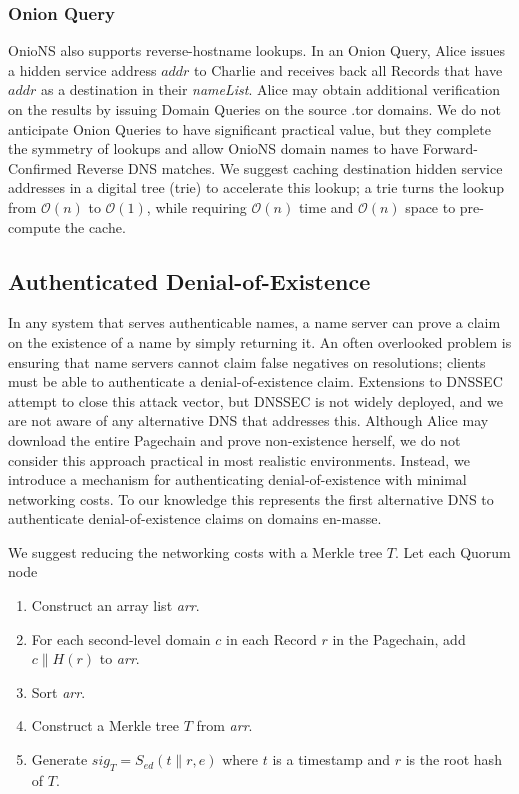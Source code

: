 \documentclass{sig-alternate}
\newcommand*\concat{\mathbin{\|}}
\begin{document}
\subsubsection{Onion Query}

OnioNS also supports reverse-hostname lookups. In an Onion Query, Alice issues a hidden service address $ \mathit{addr} $ to Charlie and receives back all Records that have $ \mathit{addr} $ as a destination in their \emph{nameList}. Alice may obtain additional verification on the results by issuing Domain Queries on the source .tor domains. We do not anticipate Onion Queries to have significant practical value, but they complete the symmetry of lookups and allow OnioNS domain names to have Forward-Confirmed Reverse DNS matches. We suggest caching destination hidden service addresses in a digital tree (trie) to accelerate this lookup; a trie turns the lookup from $ \mathcal{O}(n) $ to $ \mathcal{O}(1) $, while requiring $ \mathcal{O}(n) $ time and $ \mathcal{O}(n) $ space to pre-compute the cache.

\newpage

\subsection{Authenticated Denial-of-Existence}
\label{sec:authDenial}

In any system that serves authenticable names, a name server can prove a claim on the existence of a name by simply returning it. An often overlooked problem is ensuring that name servers cannot claim false negatives on resolutions; clients must be able to authenticate a denial-of-existence claim. Extensions to DNSSEC attempt to close this attack vector, but DNSSEC is not widely deployed, and we are not aware of any alternative DNS that addresses this. Although Alice may download the entire Pagechain and prove non-existence herself, we do not consider this approach practical in most realistic environments. Instead, we introduce a mechanism for authenticating denial-of-existence with minimal networking costs. To our knowledge this represents the first alternative DNS to authenticate denial-of-existence claims on domains en-masse.

We suggest reducing the networking costs with a Merkle tree\cite{merkle1988digital} $ T $. Let each Quorum node

\begin{enumerate}
	\item Construct an array list \emph{arr}.
	\item For each second-level domain $ c $ in each Record $ r $ in the Pagechain, add $ c \concat H(r) $ to \emph{arr}.
	\item Sort \emph{arr}.
	\item Construct a Merkle tree $ T $ from \emph{arr}.
	\item Generate $ \mathit{sig}_{T} = S_{\mathit{ed}}(t \concat r, e) $ where $ t $ is a timestamp and $ r $ is the root hash of $ T $.
\end{enumerate}
\end{document}
